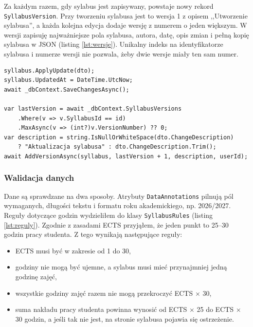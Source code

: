 \documentclass[times]{san}
\begin{document}
Za każdym razem, gdy sylabus jest zapisywany, powstaje nowy rekord \texttt{SyllabusVersion}. Przy tworzeniu sylabusa jest to wersja 1 z opisem ,,Utworzenie sylabusa'', a każda kolejna edycja dodaje wersję z numerem o jeden większym. W wersji zapisuję najważniejsze pola sylabusa, autora, datę, opis zmian i pełną kopię sylabusa w JSON (listing \ref{lst:wersje}). Unikalny indeks na identyfikatorze sylabusa i numerze wersji nie pozwala, żeby dwie wersje miały ten sam numer.

\begin{lstlisting}[language={[Sharp]C}, caption={Zapis nowej wersji przy edycji sylabusa (fragment \texttt{SyllabusService})}, label={lst:wersje}]
syllabus.ApplyUpdate(dto);
syllabus.UpdatedAt = DateTime.UtcNow;
await _dbContext.SaveChangesAsync();

var lastVersion = await _dbContext.SyllabusVersions
    .Where(v => v.SyllabusId == id)
    .MaxAsync(v => (int?)v.VersionNumber) ?? 0;
var description = string.IsNullOrWhiteSpace(dto.ChangeDescription)
    ? "Aktualizacja sylabusa" : dto.ChangeDescription.Trim();
await AddVersionAsync(syllabus, lastVersion + 1, description, userId);
\end{lstlisting}

\subsubsection{Walidacja danych}

Dane są sprawdzane na dwa sposoby. Atrybuty \texttt{DataAnnotations} pilnują pól wymaganych, długości tekstu i formatu roku akademickiego, np. 2026/2027. Reguły dotyczące godzin wydzieliłem do klasy \texttt{SyllabusRules} (listing \ref{lst:reguly}). Zgodnie z zasadami ECTS \cite{ects_guide} przyjąłem, że jeden punkt to 25--30 godzin pracy studenta. Z tego wynikają następujące reguły:
\begin{itemize}
  \item ECTS musi być w zakresie od 1 do 30,
  \item godziny nie mogą być ujemne, a sylabus musi mieć przynajmniej jedną godzinę zajęć,
  \item wszystkie godziny zajęć razem nie mogą przekroczyć ECTS $\times$ 30,
  \item suma nakładu pracy studenta powinna wynosić od ECTS $\times$ 25 do ECTS $\times$ 30 godzin, a jeśli tak nie jest, na stronie sylabusa pojawia się ostrzeżenie.
\end{itemize}
\end{document}
